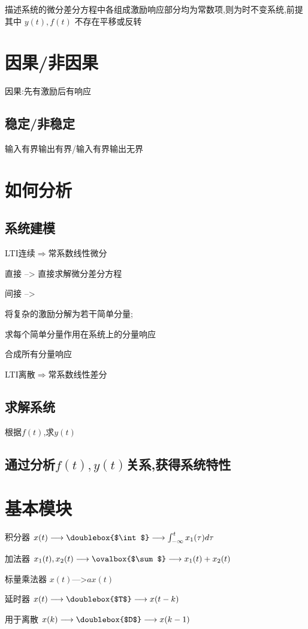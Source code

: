 \documentclass{article}
\begin{document}
    描述系统的微分差分方程中各组成激励响应部分均为常数项,则为时不变系统,前提其中 $y(t),f(t)$ 不存在平移或反转

    \section{因果/非因果}%
    因果:先有激励后有响应
    \subsection{稳定/非稳定}%
    输入有界输出有界/输入有界输出无界

    \section{如何分析}%
    \subsection{系统建模}%
    LTI连续$\Longrightarrow$常系数线性微分

    直接  -->  直接求解微分差分方程

    间接  -->  

    将复杂的激励分解为若干简单分量;

    求每个简单分量作用在系统上的分量响应

    合成所有分量响应

    LTI离散$\Longrightarrow$常系数线性差分
    \subsection{求解系统}%
    根据$f(t)$,求$y(t)$
    \subsection{通过分析$f(t),y(t)$关系,获得系统特性}%

    \section{基本模块}%
    
    积分器
    $x(t)\longrightarrow\doublebox{$\int$}\longrightarrow\int_{-\infty}^{t}x_1(\tau)d\tau$

    加法器
    $x_1(t),x_2(t)\longrightarrow\ovalbox{$\sum$}\longrightarrow x_1(t)+x_2(t)$

    标量乘法器
    $x(t)$--->$ax(t)$

    延时器
    $x(t)\longrightarrow\doublebox{$T$}\longrightarrow x(t-k)$ 

    用于离散
    $x(k)\longrightarrow\doublebox{$D$}\longrightarrow x(k-1)$ 

    
\end{document}
